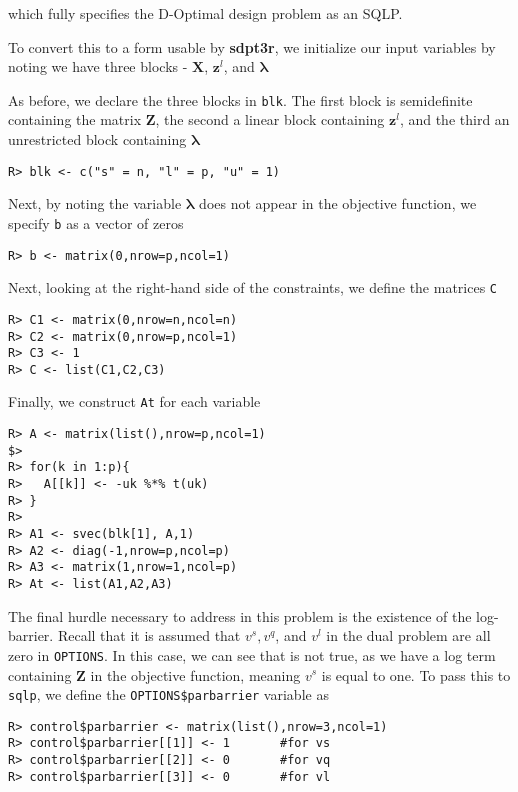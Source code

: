 \documentclass{article}
\newcommand{\ve}[1]{\mathbf{#1}}           %
\newcommand{\sv}[1]{\boldsymbol{#1}}   %
\newcommand{\m}[1]{\mathbf{#1}}               %
\begin{document}
\noindent which fully specifies the D-Optimal design problem as an SQLP. 

To convert this to a form usable by \textbf{sdpt3r}, we initialize our input variables by noting we have three blocks - $\m{X}$, $\ve{z}^{l}$, and $\sv{\lambda}$

As before, we declare the three blocks in \verb!blk!. The first block is semidefinite containing the matrix $\m{Z}$, the second a linear block containing $\ve{z}^{l}$, and the third an unrestricted block containing $\sv{\lambda}$

\begin{verbatim}
R> blk <- c("s" = n, "l" = p, "u" = 1)
\end{verbatim}

Next, by noting the variable $\sv{\lambda}$ does not appear in the objective function, we specify \verb!b! as a vector of zeros

\begin{verbatim}
R> b <- matrix(0,nrow=p,ncol=1)
\end{verbatim}

Next, looking at the right-hand side of the constraints, we define the matrices \verb!C!

\begin{verbatim}
R> C1 <- matrix(0,nrow=n,ncol=n)
R> C2 <- matrix(0,nrow=p,ncol=1)
R> C3 <- 1
R> C <- list(C1,C2,C3)
\end{verbatim}

Finally, we construct \verb!At! for each variable

\begin{verbatim}
R> A <- matrix(list(),nrow=p,ncol=1)
$>
R> for(k in 1:p){
R>   A[[k]] <- -uk %*% t(uk)
R> }
R>
R> A1 <- svec(blk[1], A,1)
R> A2 <- diag(-1,nrow=p,ncol=p)
R> A3 <- matrix(1,nrow=1,ncol=p)
R> At <- list(A1,A2,A3)
\end{verbatim}

The final hurdle necessary to address in this problem is the existence of the log-barrier. Recall that it is assumed that $v^{s}, v^{q}$, and $v^{l}$ in the dual problem are all zero in \verb!OPTIONS!. In this case, we can see that is not true, as we have a log term containing $\m{Z}$ in the objective function, meaning $v^{s}$ is equal to one. To pass this to \verb!sqlp!, we define the \verb!OPTIONS$parbarrier! variable as

\begin{verbatim}
R> control$parbarrier <- matrix(list(),nrow=3,ncol=1)
R> control$parbarrier[[1]] <- 1       #for vs
R> control$parbarrier[[2]] <- 0       #for vq
R> control$parbarrier[[3]] <- 0       #for vl
\end{verbatim}
\end{document}

